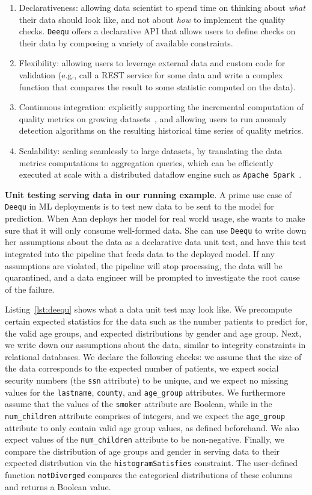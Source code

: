 \documentclass[11pt]{article}
\newcommand*{\eg}{e.g.,\xspace}
\newcommand{\deequ}{\stt{Deequ}\xspace}
\newcommand{\header}[1]{\vspace{1mm}\noindent\textbf{#1}.}
\newcommand{\stt}[1]{{\footnotesize\texttt{#1}}}
\begin{document}
\begin{enumerate}
    \item Declarativeness:  allowing data scientist to spend time on thinking about \emph{what} their data should look like, and not about \emph{how} to implement the quality checks.   \deequ offers a declarative API that allows users to define checks on their data by composing a variety of available constraints. 
    \item Flexibility: allowing users to leverage external data and custom code for validation (\eg call a REST service for some data and write a complex function that compares the result to some statistic computed on the data).  
    \item Continuous integration: explicitly supporting the incremental computation of quality metrics on growing datasets~\cite{schelter2019differential}, and allowing users to run anomaly detection algorithms on the resulting historical time series of quality metrics.
    \item Scalability: scaling seamlessly to large datasets, by translating the  data metrics computations to aggregation queries, which can be efficiently executed at scale with a distributed dataflow engine such as \stt{Apache Spark}~\cite{zaharia2012resilient}.
\end{enumerate}

\header{Unit testing serving data in our running example} A prime use case of \deequ in ML deployments is to test new data to be sent to the model for prediction. When Ann deploys her model for real world usage, she wants to make sure that it will only consume well-formed data. She can use \deequ to write down her assumptions about the data as a declarative data unit test, and have this test integrated into the pipeline that feeds data to the deployed model. If any  assumptions are violated, the pipeline will stop processing, the data will be quarantined, and a data engineer will be prompted to investigate the root cause of the failure.

Listing~\ref{lst:deequ} shows what  a data unit test may look like. We precompute certain expected statistics for the data such as the number patients to predict for, the valid age groups, and expected distributions by gender and age group. Next, we write down our assumptions about the data, similar to integrity constraints in relational databases. We declare the following checks: we assume that the size of the data corresponds to the expected number of patients, we expect social security numbers (the \stt{ssn} attribute) to be unique, and we expect no missing values for the \stt{lastname}, \stt{county}, and \stt{age\_group} attributes. We furthermore assume that the values of the \stt{smoker} attribute are Boolean, while in the \stt{num\_children} attribute comprises of integers, and we expect the \stt{age\_group} attribute to only contain valid age group values, as defined beforehand. We also expect values of the \stt{num\_children} attribute to be non-negative. Finally, we compare the distribution of age groups and gender in serving data to their expected distribution via the \stt{histogramSatisfies} constraint.  The user-defined function \stt{notDiverged} compares the categorical distributions of these columns and returns a Boolean value.
\end{document}
